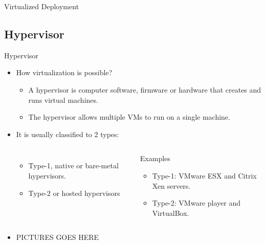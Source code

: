 \begin{frame}{Virtualized Deployment}
\end{frame}

\subsection{Hypervisor}\label{subsec:hypervisor}
\begin{frame}{Hypervisor}
    \begin{itemize}[<+- | alert@+>]
        \item How virtualization is possible?
        \begin{itemize}[<+- | alert@+>]
            \item A hypervisor is computer software, firmware or hardware that creates and runs virtual machines.
            \item The hypervisor allows multiple VMs to run on a single machine.
        \end{itemize}
        \item It is usually classified to 2 types:
        \begin{columns}[T,onlytextwidth]
            \begin{itemize}
                \item Type-1, native or bare-metal hypervisors.
                \item Type-2 or hosted hypervisors
            \end{itemize}
            \begin{block}{Examples}
                \begin{itemize}
                    \item Type-1: VMware ESX and Citrix Xen servers.
                    \item Type-2: VMware player and VirtualBox.
                \end{itemize}
            \end{block}
        \end{columns}
        \item PICTURES GOES HERE
    \end{itemize}
\end{frame}
